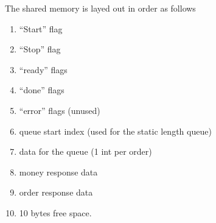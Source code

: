 \documentclass{article}
\begin{document}
The shared memory is layed out in order as follows

\begin{enumerate}
\item  ``Start'' flag
\item  ``Stop'' flag
\item  ``ready'' flags
\item  ``done'' flags
\item  ``error'' flags (unused)
\item  queue start index (used for the static length queue)
\item  data for the queue (1 int per order)
\item  money response data
\item  order response data
\item  10 bytes free space.
\end{enumerate}
\end{document}
